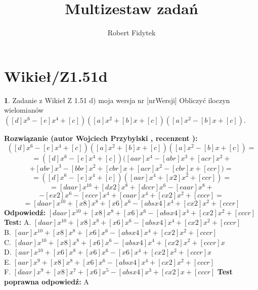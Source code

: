 \documentclass[12pt, a4paper]{article}
\title{Multizestaw zadań}
\author{Robert Fidytek}
\date{}
\theoremstyle{definition} %
\newtheorem{zad}{}
\newcommand{\kategoria}[1]{\section{#1}} %
\newcommand{\zadStart}[1]{\begin{zad}#1\newline} %
\newcommand{\zadStop}{\end{zad}}   %
\newcommand{\rozwStart}[2]{\noindent \textbf{Rozwiązanie (autor #1 , recenzent #2): }\newline} %
\newcommand{\rozwStop}{\newline}                                            %
\newcommand{\odpStart}{\noindent \textbf{Odpowiedź:}\newline}    %
\newcommand{\odpStop}{\newline}                                             %
\newcommand{\testStart}{\noindent \textbf{Test:}\newline} %
\newcommand{\testStop}{\newline} %
\newcommand{\kluczStart}{\noindent \textbf{Test poprawna odpowiedź:}\newline} %
\newcommand{\kluczStop}{\newline} %
\begin{document}
\maketitle


\kategoria{Wikieł/Z1.51d}
\zadStart{Zadanie z Wikieł Z 1.51 d) moja wersja nr [nrWersji]}
Obliczyć iloczyn wielomianów $([d]x^{6}-[e]x^{4}+[c])([a]x^{2}+[b]x+[c])([a]x^{2}-[b]x+[c])$.
\zadStop
\rozwStart{Wojciech Przybylski}{}
$$([d]x^{6}-[e]x^{4}+[c])([a]x^{2}+[b]x+[c])([a]x^{2}-[b]x+[c])=$$
$$=([d]x^{6}-[e]x^{4}+[c])([aar]x^{4}-[abr]x^{3}+[acr]x^{2}+$$
$$+[abr]x^{3}-[bbr]x^{2}+[cbr]x+[acr]x^{2}-[cbr]x+[ccr])=$$
$$=([d]x^{6}-[e]x^{4}+[c])([aar]x^{4}+[x2]x^{2}+[ccr])=$$
$$=[daar]x^{10}+[dx2]x^{8}+[dccr]x^{6}-[eaar]x^{8}+$$
$$-[ex2]x^{6}-[eccr]x^{4}+[caar]x^{4}+[cx2]x^{2}+[cccr]=$$
$$=[daar]x^{10}+[x8]x^{8}+[x6]x^{6}-[absx4]x^{4}+[cx2]x^{2}+[cccr]$$
\rozwStop
\odpStart
$[daar]x^{10}+[x8]x^{8}+[x6]x^{6}-[absx4]x^{4}+[cx2]x^{2}+[cccr]$
\odpStop
\testStart
A. $[daar]x^{10}+[x8]x^{8}+[x6]x^{6}-[absx4]x^{4}+[cx2]x^{2}+[cccr]$\\
B. $[aar]x^{10}+[x8]x^{8}+[x6]x^{6}-[absx4]x^{4}+[cx2]x^{2}+[cccr]$\\
C. $[daar]x^{10}+[x8]x^{8}+[x6]x^{6}-[absx4]x^{4}+[cx2]x^{2}+[cccr]x$\\
D. $[aar]x^{10}+[x6]x^{8}+[x6]x^{6}-[x6]x^{4}+[cx2]x^{2}+[cccr]x$\\
E. $[aar]x^{9}+[x8]x^{8}+[x6]x^{6}-[absx4]x^{4}+[cx2]x^{2}+[cccr]$\\
F. $[daar]x^{9}+[x8]x^{7}+[x6]x^{5}-[absx4]x^{3}+[cx2]x+[cccr]$
\testStop
\kluczStart
A
\kluczStop
\end{document}
